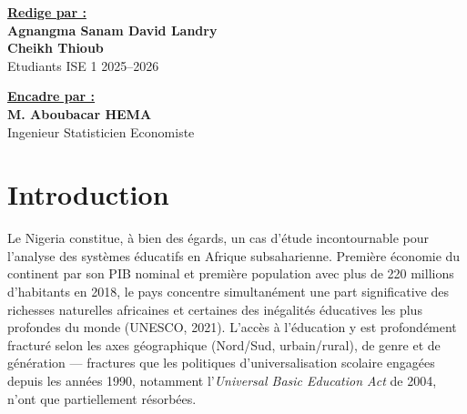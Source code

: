 \documentclass[
]{article}
\begin{document}
\begin{titlepage}
\vspace{0.8cm}
\begin{minipage}[t]{0.47\textwidth}
  \raggedright
  \underline{\textbf{\color{mainblue}Redige par :}}\\[8pt]
  \textbf{Agnangma Sanam David Landry}\\[4pt]
  \textbf{Cheikh Thioub}\\[6pt]
  {\small\color{slategray} Etudiants ISE 1 \textbullet{} 2025--2026}
\end{minipage}
\hfill
\begin{minipage}[t]{0.47\textwidth}
  \raggedleft
  \underline{\textbf{\color{mainblue}Encadre par :}}\\[8pt]
  \textbf{M. Aboubacar HEMA}\\[4pt]
  {\small\color{slategray} Ingenieur Statisticien Economiste}
\end{minipage}
\vfill
{}
\vspace{0.4cm}
\end{titlepage}
\cleardoublepage

{
\setcounter{tocdepth}{3}
\tableofcontents
}
\section{Introduction}\label{introduction}

Le Nigeria constitue, à bien des égards, un cas d'étude incontournable
pour l'analyse des systèmes éducatifs en Afrique subsaharienne. Première
économie du continent par son PIB nominal et première population avec
plus de 220 millions d'habitants en 2018, le pays concentre
simultanément une part significative des richesses naturelles africaines
et certaines des inégalités éducatives les plus profondes du monde
(UNESCO, 2021). L'accès à l'éducation y est profondément fracturé selon
les axes géographique (Nord/Sud, urbain/rural), de genre et de
génération --- fractures que les politiques d'universalisation scolaire
engagées depuis les années 1990, notamment l'\emph{Universal Basic
Education Act} de 2004, n'ont que partiellement résorbées.
\end{document}
